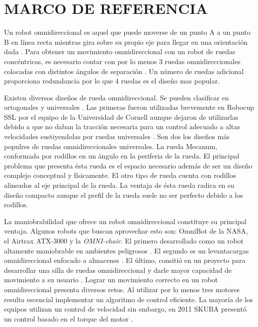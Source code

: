 \documentclass[twocolumn,10pt]{amrob}
\begin{document}
\section*{MARCO DE REFERENCIA}
Un robot omnidireccional es aquel que puede moverse de un punto A a un punto B en línea recta mientras gira sobre su propio eje para llegar en una orientación dada \cite{rojas2005short}. Para obtener un movimiento omnidireccional con un robot de ruedas concéntricas, es necesario contar con por lo menos 3 ruedas omnidireccionales colocadas con distintos ángulos de separación \cite{rojas2006holonomic}. Un número de ruedas adicional proporciona redundancia por lo que 4 ruedas es el dise\~no mas popular. \par
Existen diversos diseños de rueda omnidireccional. Se pueden clasificar en ortogonales y universales \cite{ashmore2002omni}. Las primeras fueron utilizadas brevemente en Robocup SSL por el equipo de la Universidad de Cornell \cite{d2000cornell} aunque dejaron de utilizarlas debido a que no daban la tracción necesaria para un control adecuado a altas velocidades sustiyendolas por ruedas universales \cite{purwin2003cornell}. Son dos los diseños más populres de ruedas omnidireccionales universales. La rueda Mecanum, conformada por rodillos en un ángulo en la periferia de la rueda. El principal problema que presenta ésta rueda es el espacio necesario además de ser un diseño complejo conceptual y físicamente. El otro tipo de rueda cuenta con rodillos alineados al eje principal de la rueda. La ventaja de ésta rueda radica en su diseño compacto aunque el prefil de la rueda suele no ser perfecto debido a los rodillos. \par
La maniobrabilidad que ofrece un robot omnidireccional constituye su principal ventaja. Algunos robots que buscan aprovechar esto son: OmniBot de la NASA, el Airtrax ATX-3000 y la \textit{OMNI-chair}. El primero desarrollado como un robot altamente maniobrable en ambientes peligrosos \cite{houshangi1999omnibot}. El segundo es un levantacargas omnidireccional enfocado a almacenes \cite{aduascualictei2011practical}. El último, consitió en un proyecto para desarrollar una silla de ruedas omnidireccional y darle mayor capacidad de movimiento a su usuario \cite{borgolte1998architectural}. 
Lograr un movimiento correcto en un robot omnidireccional presenta diversos retos. Al utilizar por lo menos tres motores resulta escencial implementar un algoritmo de control eficiente. La mayoría de los equipos utilizan un control de velocidad sin embargo, en 2011 SKUBA presentó un control basado en el torque del motor \cite{chaisoskuba}. %
\end{document}
